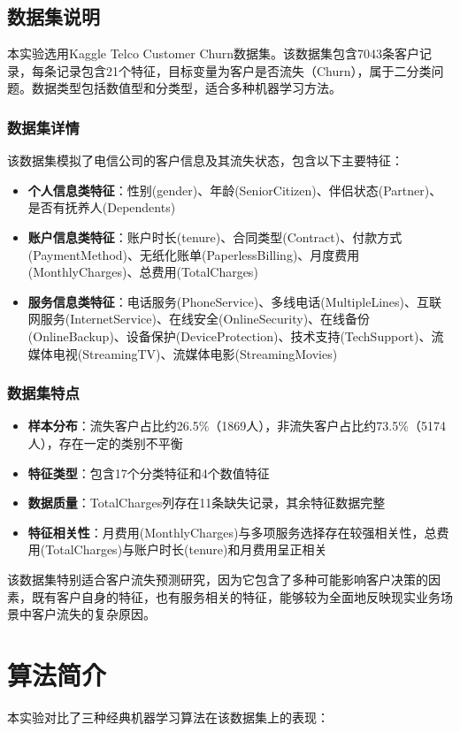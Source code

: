 \documentclass{article}
\begin{document}
\subsection{数据集说明}
本实验选用Kaggle Telco Customer Churn数据集。该数据集包含7043条客户记录，每条记录包含21个特征，目标变量为客户是否流失（Churn），属于二分类问题。数据类型包括数值型和分类型，适合多种机器学习方法。

\subsubsection{数据集详情}
该数据集模拟了电信公司的客户信息及其流失状态，包含以下主要特征：
\begin{itemize}
    \item \textbf{个人信息类特征}：性别(gender)、年龄(SeniorCitizen)、伴侣状态(Partner)、是否有抚养人(Dependents)
    \item \textbf{账户信息类特征}：账户时长(tenure)、合同类型(Contract)、付款方式(PaymentMethod)、无纸化账单(PaperlessBilling)、月度费用(MonthlyCharges)、总费用(TotalCharges)
    \item \textbf{服务信息类特征}：电话服务(PhoneService)、多线电话(MultipleLines)、互联网服务(InternetService)、在线安全(OnlineSecurity)、在线备份(OnlineBackup)、设备保护(DeviceProtection)、技术支持(TechSupport)、流媒体电视(StreamingTV)、流媒体电影(StreamingMovies)
\end{itemize}

\subsubsection{数据集特点}
\begin{itemize}
    \item \textbf{样本分布}：流失客户占比约26.5\%（1869人），非流失客户占比约73.5\%（5174人），存在一定的类别不平衡
    \item \textbf{特征类型}：包含17个分类特征和4个数值特征
    \item \textbf{数据质量}：TotalCharges列存在11条缺失记录，其余特征数据完整
    \item \textbf{特征相关性}：月费用(MonthlyCharges)与多项服务选择存在较强相关性，总费用(TotalCharges)与账户时长(tenure)和月费用呈正相关
\end{itemize}

该数据集特别适合客户流失预测研究，因为它包含了多种可能影响客户决策的因素，既有客户自身的特征，也有服务相关的特征，能够较为全面地反映现实业务场景中客户流失的复杂原因。

\section{算法简介}
本实验对比了三种经典机器学习算法在该数据集上的表现：
\end{document}
